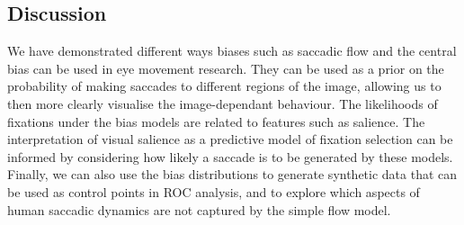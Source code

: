 \subsection{Discussion}

We have demonstrated different ways biases such as saccadic flow and the central bias can be used in eye movement research. They can be used as a prior on the probability of making saccades to different regions of the image, allowing us to then more clearly visualise the image-dependant behaviour. The likelihoods of fixations under the bias models are related to features such as salience. The interpretation of visual salience as a predictive model of fixation selection can be informed by considering how likely a saccade is to be generated by these models. Finally, we can also use the bias distributions to generate synthetic data that can be used as control points in ROC analysis, and to explore which aspects of human saccadic dynamics are not captured by the simple flow model. 
